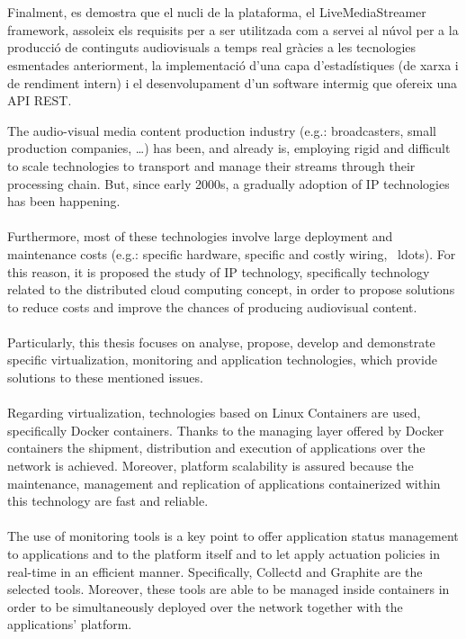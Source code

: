 \documentclass[english,final]{setup/eetac_tfc_pfc}
\begin{document}
\begin{resum}{10cm}
  \\
  \\
  Finalment, es demostra que el nucli de la plataforma, el LiveMediaStreamer framework, assoleix els requisits per a ser utilitzada com a servei al núvol per a la producció de continguts audiovisuals a temps real gràcies a les tecnologies esmentades anteriorment, la implementació d'una capa d'estadístiques (de xarxa i de rendiment intern) i el desenvolupament d'un software intermig que ofereix una API REST.
  
\end{resum}

\begin{overview}{11cm}
  The audio-visual media content production industry (e.g.: broadcasters, small production companies, \ldots) has been, and already is, employing rigid and difficult to scale technologies to transport and manage their streams through their processing chain. But, since early 2000s, a gradually adoption of IP technologies has been happening.
  \\
  \\
  Furthermore, most of these technologies involve large deployment and maintenance costs (e.g.: specific hardware, specific and costly wiring, \ ldots). For this reason, it is proposed the study of IP technology, specifically technology related to the distributed cloud computing concept, in order to propose solutions to reduce costs and improve the chances of producing audiovisual content.
  \\
  \\
  Particularly, this thesis focuses on analyse, propose, develop and demonstrate specific virtualization, monitoring and application technologies, which provide solutions to these mentioned issues.   
  \\
  \\
  Regarding virtualization, technologies based on Linux Containers are used, specifically Docker containers. Thanks to the managing layer offered by Docker containers the shipment, distribution and execution of applications over the network is achieved. Moreover, platform scalability is assured because the maintenance, management and replication of applications containerized within this technology are fast and reliable.
  \\
  \\
  The use of monitoring tools is a key point to offer application status management to applications and to the platform itself and to let apply actuation policies in real-time in an efficient manner. Specifically, Collectd and Graphite are the selected tools. Moreover, these tools are able to be managed inside containers in order to be simultaneously deployed over the network together with the applications' platform. 

\end{overview}
\end{document}
